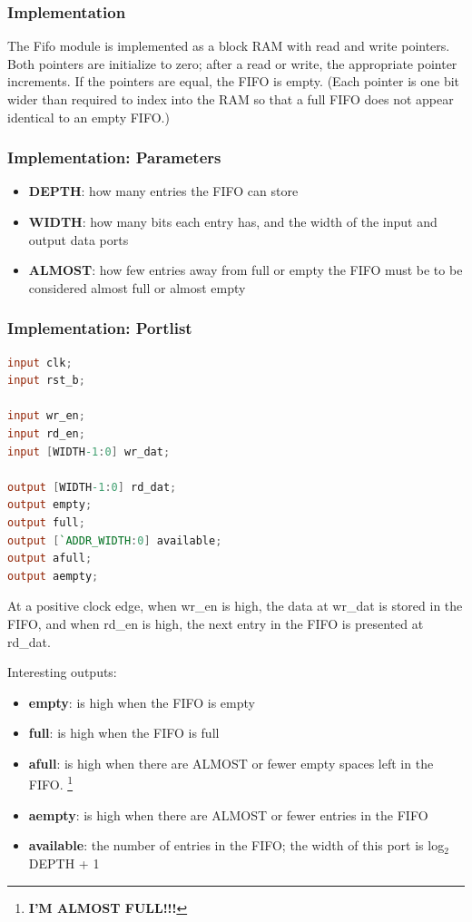 \documentclass[10pt]{article}
\begin{document}
\subsubsection{Implementation}

The Fifo module is implemented as a block RAM with read and write pointers.
Both pointers are initialize to zero; after a read or write, the appropriate
pointer increments. If the pointers are equal, the FIFO is empty. (Each
pointer is one bit wider than required to index into the RAM so that a full
FIFO does not appear identical to an empty FIFO.)

\subsubsection{Implementation: Parameters}

\begin{itemize}
\item{\textbf{DEPTH}: how many entries the FIFO can store}
\item{\textbf{WIDTH}: how many bits each entry has, and the width of the input and
output data ports}
\item{\textbf{ALMOST}: how few entries away from full or empty the FIFO must be to be
considered almost full or almost empty}
\end{itemize}

\subsubsection{Implementation: Portlist}
\begin{lstlisting}[basicstyle=\footnotesize,language=Verilog]
input clk;
input rst_b;
 
input wr_en;
input rd_en;
input [WIDTH-1:0] wr_dat;
 
output [WIDTH-1:0] rd_dat;
output empty;
output full;
output [`ADDR_WIDTH:0] available;
output afull;
output aempty;
\end{lstlisting}

At a positive clock edge, when wr\_en is high, the data at wr\_dat is stored
in the FIFO, and when rd\_en is high, the next entry in the FIFO is presented
at rd\_dat.

Interesting outputs:
\begin{itemize}
\item{\textbf{empty}: is high when the FIFO is empty}
\item{\textbf{full}: is high when the FIFO is full}
\item{\textbf{afull}: is high when there are ALMOST or fewer empty spaces left in the
FIFO. \footnote{\Huge{\textbf{I'M ALMOST FULL!!!}}} }
\item{\textbf{aempty}: is high when there are ALMOST or fewer entries in the FIFO}
\item{\textbf{available}: the number of entries in the FIFO; the width of this port is
log${}_2$ DEPTH + 1}
\end{itemize}
\end{document}
